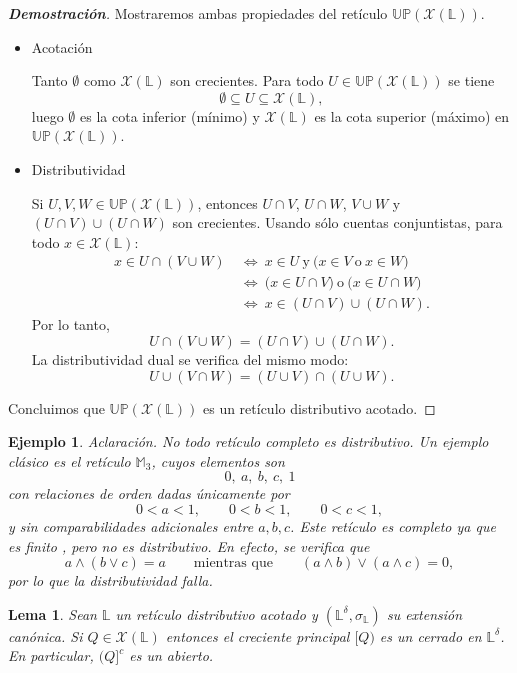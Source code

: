 \documentclass[12pt]{book}
\newtheorem{lemma}[theorem]{Lema}
\newtheorem{example}{Ejemplo}
\newcommand{\Up}{\mathbb{UP}}
\begin{document}
\begin{proof}[\textbf{Demostración}]
Mostraremos ambas propiedades del retículo $\Up(\mathcal{X}(\mathbb{L}))$.
\begin{itemize}
    \item Acotación
    
Tanto $\emptyset$ como $\mathcal{X}(\mathbb{L})$ son crecientes.  
Para todo $U\in\Up(\mathcal{X}(\mathbb{L}))$ se tiene
\[
\emptyset \subseteq U \subseteq \mathcal{X}(\mathbb{L}),
\]
luego $\emptyset$ es la cota inferior (mínimo) y $\mathcal{X}(\mathbb{L})$ es la cota superior (máximo) en $\Up(\mathcal{X}(\mathbb{L}))$.

\item Distributividad

Si $U,V,W\in\Up(\mathcal{X}(\mathbb{L}))$, entonces $U\cap V$, $U\cap W$, $V\cup W$ y $(U\cap V)\cup(U\cap W)$ son crecientes.  
Usando sólo cuentas conjuntistas, para todo $x\in \mathcal{X}(\mathbb{L})$:
\[
\begin{aligned}
x\in U\cap(V\cup W)
&\ \Longleftrightarrow\ x\in U\ \text{y}\ \bigl(x\in V\ \text{o}\ x\in W\bigr) \\
&\ \Longleftrightarrow\ \bigl(x\in U\cap V\bigr)\ \text{o}\ \bigl(x\in U\cap W\bigr) \\
&\ \Longleftrightarrow\ x\in (U\cap V)\cup(U\cap W).
\end{aligned}
\]
Por lo tanto,
\[
U\cap(V\cup W)=(U\cap V)\cup(U\cap W).
\]
La distributividad dual se verifica del mismo modo:
\[
U\cup(V\cap W)=(U\cup V)\cap(U\cup W).
\]
\end{itemize}
Concluimos que $\Up(\mathcal{X}(\mathbb{L}))$ es un retículo distributivo acotado.
\end{proof}

\begin{example}\label{ej:M3-no-distributivo}
Aclaración. No todo retículo completo es distributivo. Un ejemplo clásico es el retículo \(\mathbb{M}_3\), cuyos elementos son
\[
0,\ a,\ b,\ c,\ 1
\]
con relaciones de orden dadas únicamente por
\[
0<a<1,\qquad 0<b<1,\qquad 0<c<1,
\]
y sin comparabilidades adicionales entre \(a,b,c\). Este retículo es completo ya que es finito , pero no es distributivo. En efecto, se verifica que
\[
a\wedge(b\vee c)=a\qquad\text{mientras que}\qquad
(a\wedge b)\vee(a\wedge c)=0,
\]
por lo que la distributividad falla. 
\end{example}

\begin{lemma}\label{lem:creciente-cerrado} Sean $\mathbb L$ un retículo distributivo acotado y $\left( \mathbb{L}^{\delta},\sigma_{\mathbb{L}} \right)$ su extensión canónica. Si $Q\in\mathcal X(\mathbb L)$ entonces el creciente principal $[Q)$ es un cerrado en $\mathbb{L}^{\delta}$. En particular, $(Q]^c$ es un abierto.
\end{lemma}
\end{document}
